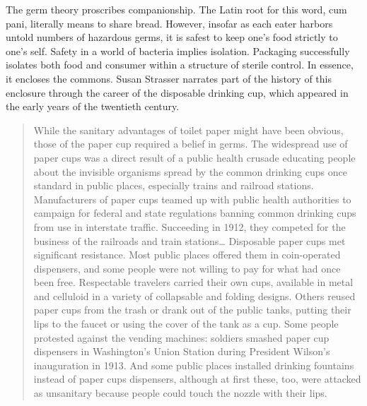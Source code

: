 
The germ theory proscribes companionship. The Latin root for this word, cum pani, literally means to share bread. However, insofar as each eater harbors untold numbers of hazardous germs, it is safest to keep one’s food strictly to one’s self. Safety in a world of bacteria implies isolation. Packaging successfully isolates both food and consumer within a structure of sterile control. In essence, it encloses the commons. Susan Strasser narrates part of the history of this enclosure through the career of the disposable drinking cup, which appeared in the early years of the twentieth century.


\begin{singlespace}
\begin{quote}
While the sanitary advantages of toilet paper might have been obvious, those of the paper cup required a belief in germs. The widespread use of paper cups was a direct result of a public health crusade educating people about the invisible organisms spread by the common drinking cups once standard in public places, especially trains and railroad stations. Manufacturers of paper cups teamed up with public health authorities to campaign for federal and state regulations banning common drinking cups from use in interstate traffic. Succeeding in 1912, they competed for the business of the railroads and train stations\ldots
Disposable paper cups met significant resistance. Most public places offered them in coin-operated dispensers, and some people were not willing to pay for what had once been free. Respectable travelers carried their own cups, available in metal and celluloid in a variety of collapsable and folding designs. Others reused paper cups from the trash or drank out of the public tanks, putting their lips to the faucet or using the cover of the tank as a cup. Some people protested against the vending machines: soldiers smashed paper cup dispensers in Washington’s Union Station during President Wilson’s inauguration in 1913. And some public places installed drinking fountains instead of paper cups dispensers, although at first these, too, were attacked as unsanitary because people could touch the nozzle with their lips. \citep{strasser1999waste}
\end{quote}
\end{singlespace}

